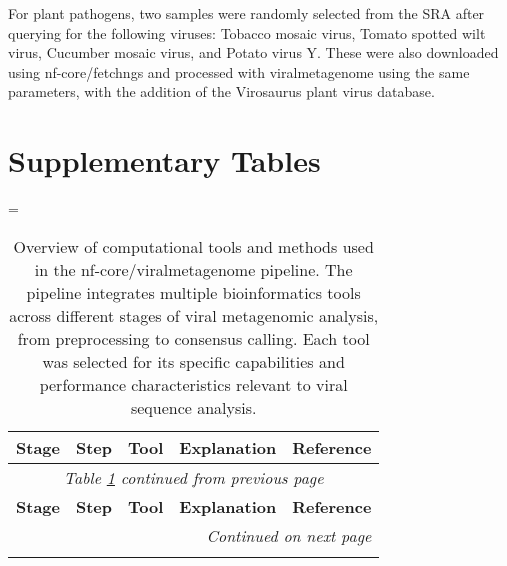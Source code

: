 For plant pathogens, two samples were randomly selected from the SRA after querying for the following viruses: Tobacco mosaic virus, Tomato spotted wilt virus, Cucumber mosaic virus, and Potato virus Y. These were also downloaded using nf-core/fetchngs and processed with viralmetagenome using the same parameters, with the addition of the Virosaurus plant virus database.

\newpage

\section*{Supplementary Tables}

\LTcapwidth=\textwidth
\begin{longtable}{p{2cm}p{1.8cm}p{1.8cm}p{8.3cm}p{1cm}}
\caption{Overview of computational tools and methods used in the nf-core/viralmetagenome pipeline. The pipeline integrates multiple bioinformatics tools across different stages of viral metagenomic analysis, from preprocessing to consensus calling. Each tool was selected for its specific capabilities and performance characteristics relevant to viral sequence analysis.}
\label{table:S1} \\
\toprule
\textbf{Stage} & \textbf{Step} & \textbf{Tool} & \textbf{Explanation} & \textbf{Reference} \\
\midrule
\endfirsthead

\multicolumn{5}{c}{\textit{Table \ref{table:S1} continued from previous page}} \\
\toprule
\textbf{Stage} & \textbf{Step} & \textbf{Tool} & \textbf{Explanation} & \textbf{Reference} \\
\midrule
\endhead

\midrule
\multicolumn{5}{r}{\textit{Continued on next page}} \\
\endfoot

\bottomrule
\endlastfoot


\end{longtable}
